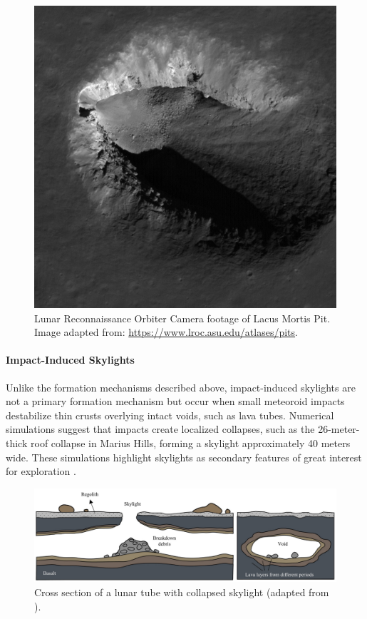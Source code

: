 \begin{figure}[H]
    \centering
    \includegraphics[width=0.33\linewidth]{lunar-pit-highland.png}
    \caption{Lunar Reconnaissance Orbiter Camera footage of Lacus Mortis Pit. Image adapted from: \url{https://www.lroc.asu.edu/atlases/pits}.}
    \label{fig:highland-lunar-pit}
\end{figure}

\paragraph{Impact-Induced Skylights}
Unlike the formation mechanisms described above, impact-induced skylights are not a primary formation mechanism but occur when small meteoroid impacts destabilize thin crusts overlying intact voids, such as lava tubes. Numerical simulations suggest that impacts create localized collapses, such as the 26-meter-thick roof collapse in Marius Hills, forming a skylight approximately 40 meters wide. These simulations highlight skylights as secondary features of great interest for exploration \cite{clrn-impact-melt, lunar-pits-numerical-modelling}.

\begin{figure}[H]
    \centering
    \includegraphics[width=0.99\linewidth]{lunar-pit-in-lava-tube.png}
    \caption{Cross section of a lunar tube with collapsed skylight (adapted from \cite{bases-feng}).}
    \label{fig:impact-induced-skylight}
\end{figure}


